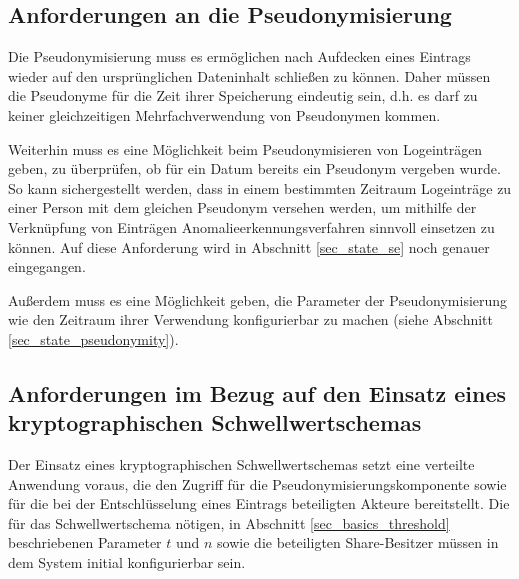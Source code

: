 \subsection{Anforderungen an die Pseudonymisierung}

\label{subsec_impl_requirements_pseudonymity}


Die Pseudonymisierung muss es ermöglichen nach Aufdecken eines Eintrags wieder auf den ursprünglichen Dateninhalt schließen zu können. Daher müssen die Pseudonyme für die Zeit ihrer Speicherung eindeutig sein, d.h. es darf zu keiner gleichzeitigen Mehrfachverwendung von Pseudonymen kommen. 

Weiterhin muss es eine Möglichkeit beim Pseudonymisieren von Logeinträgen geben, zu überprüfen, ob für ein Datum bereits ein Pseudonym vergeben wurde. So kann sichergestellt werden, dass in einem bestimmten Zeitraum Logeinträge zu einer Person mit dem gleichen Pseudonym versehen werden, um mithilfe der Verknüpfung von Einträgen Anomalieerkennungsverfahren sinnvoll einsetzen zu können. Auf diese Anforderung wird in Abschnitt \ref{sec_state_se} noch genauer eingegangen.

Außerdem muss es eine Möglichkeit geben, die Parameter der Pseudonymisierung wie den Zeitraum ihrer Verwendung konfigurierbar zu machen (siehe Abschnitt \ref{sec_state_pseudonymity}).

\subsection{Anforderungen im Bezug auf den Einsatz eines kryptographischen Schwellwertschemas}

\label{subsec_impl_requirements_threshold}


Der Einsatz eines kryptographischen Schwellwertschemas setzt eine verteilte Anwendung voraus, die den Zugriff für die Pseudonymisierungskomponente sowie für die bei der Entschlüsselung eines Eintrags beteiligten Akteure bereitstellt. Die für das Schwellwertschema nötigen, in Abschnitt \ref{sec_basics_threshold} beschriebenen Parameter \(t\) und \(n\)  sowie die beteiligten Share-Besitzer müssen in dem System initial konfigurierbar sein.

